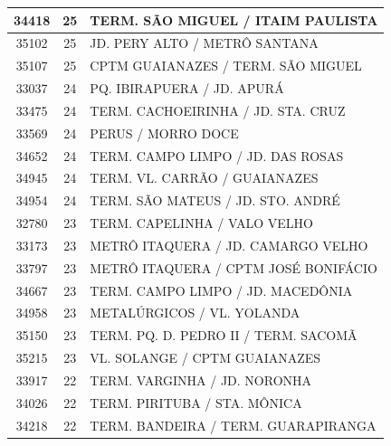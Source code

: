 \documentclass[
	12pt,				%
	oneside,			%
	a4paper,			%
	english,			%
	brazil				%
	]{abntex2ppgsi}
\begin{document}
\begin{apendicesenv}
\begin{longtable}{c|c|p{7cm}}
    34418 & 25    & TERM. SÃO MIGUEL / ITAIM PAULISTA \\
\hline

    35102 & 25    & JD. PERY ALTO / METRÔ SANTANA \\
\hline

    35107 & 25    & CPTM GUAIANAZES / TERM. SÃO MIGUEL \\
\hline

    33037 & 24    & PQ. IBIRAPUERA / JD. APURÁ \\
\hline

    33475 & 24    & TERM. CACHOEIRINHA / JD. STA. CRUZ \\
\hline

    33569 & 24    & PERUS / MORRO DOCE \\
\hline

    34652 & 24    & TERM. CAMPO LIMPO / JD. DAS ROSAS \\
\hline

    34945 & 24    & TERM. VL. CARRÃO / GUAIANAZES \\
\hline

    34954 & 24    & TERM. SÃO MATEUS / JD. STO. ANDRÉ \\
\hline

    32780 & 23    & TERM. CAPELINHA / VALO VELHO \\
\hline

    33173 & 23    & METRÔ ITAQUERA / JD. CAMARGO VELHO \\
\hline

    33797 & 23    & METRÔ ITAQUERA / CPTM JOSÉ BONIFÁCIO \\
\hline

    34667 & 23    & TERM. CAMPO LIMPO / JD. MACEDÔNIA \\
\hline

    34958 & 23    & METALÚRGICOS / VL. YOLANDA \\
\hline

    35150 & 23    & TERM. PQ. D. PEDRO II / TERM. SACOMÃ \\
\hline

    35215 & 23    & VL. SOLANGE / CPTM GUAIANAZES \\
\hline

    33917 & 22    & TERM. VARGINHA / JD. NORONHA \\
\hline

    34026 & 22    & TERM. PIRITUBA / STA. MÔNICA \\
\hline

    34218 & 22    & TERM. BANDEIRA / TERM. GUARAPIRANGA \\
\hline


\end{longtable}
\end{apendicesenv}
\end{document}
